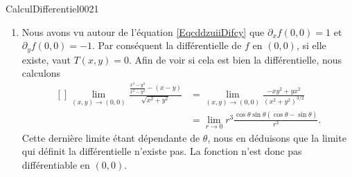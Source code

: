 \begin{corrige}{CalculDifferentiel0021}

	\begin{enumerate}

		\item
			Nous avons vu autour de l'équation \eqref{EqcddzuiiDifcy} que $\partial_xf(0,0)=1$ et $\partial_yf(0,0)=-1$. Par conséquent la différentielle de $f$ en $(0,0)$, si elle existe, vaut $T(x,y)=0$. Afin de voir si cela est bien la différentielle, nous calculons
			\begin{equation}
				\begin{aligned}[]
					\lim_{(x,y)\to(0,0)}\frac{ \frac{ x^3-y^3 }{ x^2-y^2 }-(x-y) }{ \sqrt{x^2+y^2} }&=\lim_{(x,y)\to(0,0)}\frac{ -xy^2+yx^2 }{ (x^2+y^2)^{3/2} }\\
					&=\lim_{r\to 0} r^3\frac{ \cos\theta\sin\theta(\cos\theta-\sin\theta) }{ r^3 }.
				\end{aligned}
			\end{equation}
			Cette dernière limite étant dépendante de $\theta$, nous en déduisons que la limite qui définit la différentielle n'existe pas. La fonction n'est donc pas différentiable en $(0,0)$.
	\end{enumerate}
	

\end{corrige}
